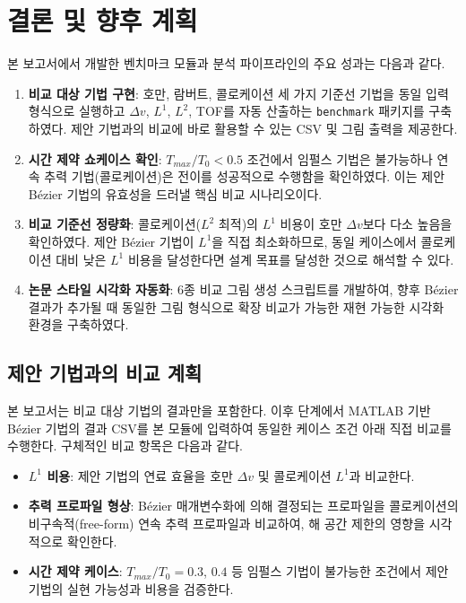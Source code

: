 \documentclass[11pt]{article}
\begin{document}
\section{결론 및 향후 계획}

본 보고서에서 개발한 벤치마크 모듈과 분석 파이프라인의 주요 성과는 다음과 같다.

\begin{enumerate}
  \item \textbf{비교 대상 기법 구현}: 호만, 람버트, 콜로케이션 세 가지 기준선 기법을 동일 입력 형식으로 실행하고 $\Delta v$, $L^1$, $L^2$, TOF를 자동 산출하는 \texttt{benchmark} 패키지를 구축하였다. 제안 기법과의 비교에 바로 활용할 수 있는 CSV 및 그림 출력을 제공한다.
  \item \textbf{시간 제약 쇼케이스 확인}: $T_{max}/T_0 < 0.5$ 조건에서 임펄스 기법은 불가능하나 연속 추력 기법(콜로케이션)은 전이를 성공적으로 수행함을 확인하였다. 이는 제안 B\'{e}zier 기법의 유효성을 드러낼 핵심 비교 시나리오이다.
  \item \textbf{비교 기준선 정량화}: 콜로케이션($L^2$ 최적)의 $L^1$ 비용이 호만 $\Delta v$보다 다소 높음을 확인하였다. 제안 B\'{e}zier 기법이 $L^1$을 직접 최소화하므로, 동일 케이스에서 콜로케이션 대비 낮은 $L^1$ 비용을 달성한다면 설계 목표를 달성한 것으로 해석할 수 있다.
  \item \textbf{논문 스타일 시각화 자동화}: 6종 비교 그림 생성 스크립트를 개발하여, 향후 B\'{e}zier 결과가 추가될 때 동일한 그림 형식으로 확장 비교가 가능한 재현 가능한 시각화 환경을 구축하였다.
\end{enumerate}

\subsection*{제안 기법과의 비교 계획}

본 보고서는 비교 대상 기법의 결과만을 포함한다.
이후 단계에서 MATLAB 기반 B\'{e}zier 기법의 결과 CSV를 본 모듈에 입력하여 동일한 케이스 조건 아래 직접 비교를 수행한다.
구체적인 비교 항목은 다음과 같다.

\begin{itemize}
  \item \textbf{$L^1$ 비용}: 제안 기법의 연료 효율을 호만 $\Delta v$ 및 콜로케이션 $L^1$과 비교한다.
  \item \textbf{추력 프로파일 형상}: B\'{e}zier 매개변수화에 의해 결정되는 프로파일을 콜로케이션의 비구속적(free-form) 연속 추력 프로파일과 비교하여, 해 공간 제한의 영향을 시각적으로 확인한다.
  \item \textbf{시간 제약 케이스}: $T_{max}/T_0 = 0.3$, $0.4$ 등 임펄스 기법이 불가능한 조건에서 제안 기법의 실현 가능성과 비용을 검증한다.
\end{itemize}
\end{document}
